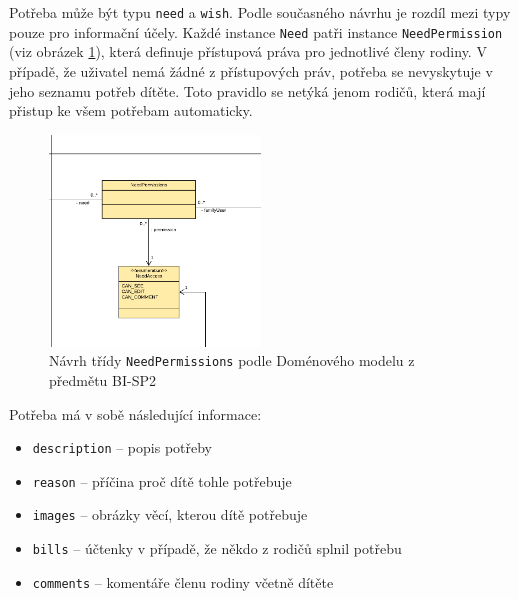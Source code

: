         Potřeba může být typu \texttt{need} a \texttt{wish}. Podle současného návrhu je rozdíl mezi typy pouze pro informační účely. Každé instance \texttt{Need} patři instance \texttt{NeedPermission} (viz obrázek \ref{image:NeedPermissions1}), která definuje přístupová práva pro jednotlivé členy rodiny. V případě, že uživatel nemá žádné z přístupových práv, potřeba se nevyskytuje v jeho seznamu potřeb dítěte. Toto pravidlo se netýká jenom rodičů, která mají přistup ke všem potřebam automaticky. 
        \begin{figure}\centering
	        \includegraphics[width=0.5\textwidth]{pdfs/NeedPermissions1}
	        \caption[Návrh NeedPermissions]{Návrh třídy \texttt{NeedPermissions} podle Doménového modelu z předmětu BI-SP2}\label{image:NeedPermissions1}
        \end{figure}
       
       Potřeba má v sobě následující informace:
        \begin{itemize}
            \item \texttt{description} -- popis potřeby
            \item \texttt{reason} -- příčina proč dítě tohle potřebuje
            \item \texttt{images} -- obrázky věcí, kterou dítě potřebuje
            \item \texttt{bills} -- účtenky v případě, že někdo z rodičů splnil potřebu
            \item \texttt{comments} -- komentáře členu rodiny včetně dítěte
        \end{itemize}
     
